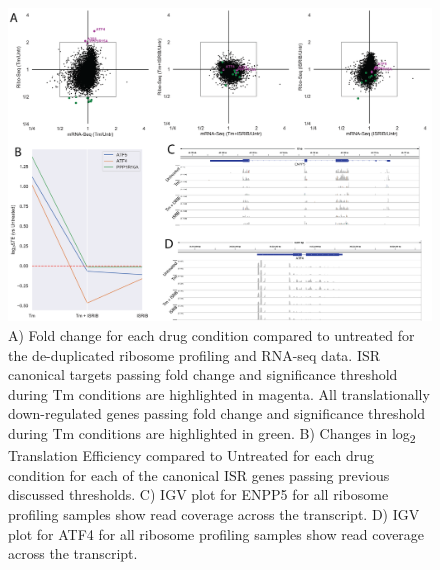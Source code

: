 \documentclass[11pt, a4paper, oneside]{article}
\begin{document}
\begin{figure}
\centering
  \includegraphics[width=180mm]{figures/xpresspipe_supplement3.png}
  \caption{A) Fold change for each drug condition compared to untreated for the de-duplicated ribosome profiling and RNA-seq data. ISR canonical targets passing fold change and significance threshold during Tm conditions are highlighted in magenta. All translationally down-regulated genes passing fold change and significance threshold during Tm conditions are highlighted in green. B) Changes in log\textsubscript{2} Translation Efficiency compared to Untreated for each drug condition for each of the canonical ISR genes passing previous discussed thresholds. C) IGV plot for ENPP5 for all ribosome profiling samples show read coverage across the transcript. D) IGV plot for ATF4 for all ribosome profiling samples show read coverage across the transcript.}
  \label{fig:supplement3}
\end{figure}
\end{document}
